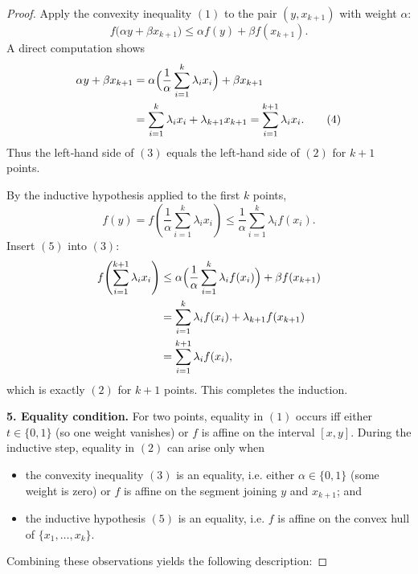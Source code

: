 \begin{proof}
Apply the convexity inequality \((1)\) to the pair \((y,x_{k+1})\) with weight
\(\alpha\):
\begin{equation}
f\bigl(\alpha y+\beta x_{k+1}\bigr)
   \le \alpha f(y)+\beta f(x_{k+1}). \tag{3}
\end{equation}
A direct computation shows
\begin{align}
\alpha y+\beta x_{k+1}
   &=\alpha\Bigl(\frac{1}{\alpha}\sum_{i=1}^{k}\lambda_{i}x_{i}\Bigr)
     +\beta x_{k+1} \nonumber\\
   &=\sum_{i=1}^{k}\lambda_{i}x_{i}+\lambda_{k+1}x_{k+1}
    =\sum_{i=1}^{k+1}\lambda_{i}x_{i}. \tag{4}
\end{align}
Thus the left‑hand side of \((3)\) equals the left‑hand side of \((2)\) for
\(k+1\) points.

By the inductive hypothesis applied to the first \(k\) points,
\begin{equation}
f(y)=f\!\left(\frac{1}{\alpha}\sum_{i=1}^{k}\lambda_{i}x_{i}\right)
    \le\frac{1}{\alpha}\sum_{i=1}^{k}\lambda_{i}f(x_{i}). \tag{5}
\end{equation}
Insert \((5)\) into \((3)\):
\begin{align*}
f\!\left(\sum_{i=1}^{k+1}\lambda_{i}x_{i}\right)
   &\le \alpha\Bigl(\frac{1}{\alpha}\sum_{i=1}^{k}\lambda_{i}f(x_{i})\Bigr)
        +\beta f(x_{k+1}) \\
   &=\sum_{i=1}^{k}\lambda_{i}f(x_{i})+\lambda_{k+1}f(x_{k+1}) \\
   &=\sum_{i=1}^{k+1}\lambda_{i}f(x_{i}),
\end{align*}
which is exactly \((2)\) for \(k+1\) points.  This completes the induction.

\medskip\noindent\textbf{5. Equality condition.}  
For two points, equality in \((1)\) occurs iff either \(t\in\{0,1\}\) (so one
weight vanishes) or \(f\) is affine on the interval \([x,y]\).
During the inductive step, equality in \((2)\) can arise only when

\begin{itemize}
  \item the convexity inequality \((3)\) is an equality, i.e. either
        \(\alpha\in\{0,1\}\) (some weight is zero) or \(f\) is affine on the
        segment joining \(y\) and \(x_{k+1}\); and
  \item the inductive hypothesis \((5)\) is an equality, i.e. \(f\) is affine on
        the convex hull of \(\{x_{1},\dots ,x_{k}\}\).
\end{itemize}
Combining these observations yields the following description:


\end{proof}
